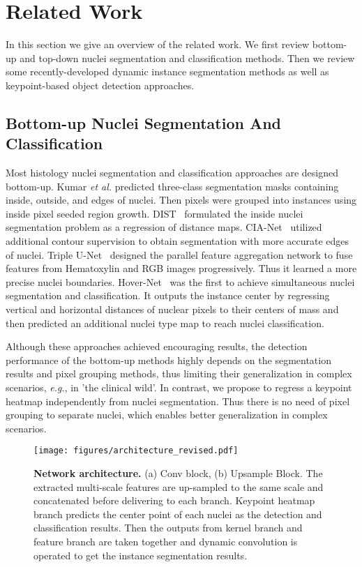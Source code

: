 \documentclass[lettersize,journal]{IEEEtran}
\newcommand{\etal}{{\textit{et al.}}}
\newcommand{\eg}{{\textit{e.g.}}, }
\begin{document}
\section{Related Work}
In this section we give an overview of the related work. We first review bottom-up and top-down  nuclei segmentation and classification methods. Then we review some recently-developed dynamic instance segmentation methods as well as keypoint-based object detection approaches.
\subsection{Bottom-up Nuclei Segmentation And Classification}
Most histology nuclei segmentation and classification approaches are designed bottom-up.  Kumar \etal\cite{kumar} predicted three-class segmentation masks containing inside, outside, and edges of nuclei. Then pixels were grouped into instances using inside pixel seeded region growth. DIST~\cite{dist} formulated the inside nuclei segmentation problem as a regression of distance maps. CIA-Net~\cite{cianet} utilized additional contour supervision to obtain segmentation  with more accurate edges of nuclei. Triple U-Net~\cite{tripleunet} designed the parallel feature aggregation network to fuse features from Hematoxylin and RGB images progressively. Thus it learned a more precise nuclei boundaries. Hover-Net~\cite{hovernet} was the first to achieve simultaneous nuclei segmentation and classification. It outputs the instance center by regressing vertical and horizontal distances of nuclear pixels to their centers of mass and then predicted an additional nuclei type map to reach nuclei classification. 

Although these approaches achieved encouraging results, the detection performance of the bottom-up methods highly depends on the segmentation results and pixel grouping methods, thus  limiting their generalization  in complex scenarios, \eg in 'the clinical wild'. In contrast, we propose to regress a keypoint heatmap independently from nuclei segmentation. Thus there is no need of pixel grouping to separate nuclei, which enables  better generalization in complex scenarios.

\begin{figure*}[t]
\centering
\texttt{[image: figures/architecture\_revised.pdf]}
\caption{\textbf{Network architecture.} (a) Conv block, (b) Upsample Block. The extracted multi-scale features are up-sampled to the same scale and concatenated before delivering to each branch. Keypoint heatmap branch predicts the center point of each nuclei as the detection and classification results. Then the outputs from kernel branch and feature branch are taken together and dynamic convolution is operated to get the instance segmentation results. }
\label{fig:arc}
\end{figure*}
\end{document}
